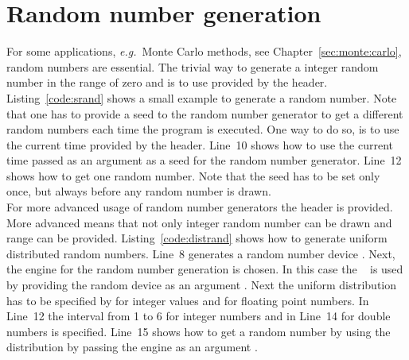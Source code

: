 \section{Random number generation}
\label{sec:random:numbers}
For some applications, \emph{e.g.}\ Monte Carlo methods, see Chapter~\ref{sec:monte:carlo}, random numbers are essential. The trivial way to generate a integer random number in the range of zero and  is to use  provided by the  header. Listing~\ref{code:srand} shows a small example to generate a random number. Note that one has to provide a seed to the random number generator to get a different random numbers each time the program is executed. One way to do so, is to use the current time  provided by the  header. Line~10 shows how to use the current time passed as an argument  as a seed for the random number generator. Line~\mbox{12} shows how to get one random number. Note that the seed has to be set only once, but always before any random number is drawn.\\



For more advanced usage of random number generators the  header is provided. More advanced means that not only integer random number can be drawn and range can be provided. Listing~\ref{code:distrand} shows how to generate uniform distributed random numbers. Line~8 generates a random number device . Next, the engine for the random number generation is chosen. In this case the ~\cite{matsumoto1998mersenne} is used by providing the random device as an argument . Next the uniform distribution has to be specified by  for integer values and  for floating point numbers. In Line~12 the interval from 1 to 6 for integer numbers and in Line~14 for double numbers is specified. Line~15 shows how to get a random number by using the distribution by passing the engine as an argument .

